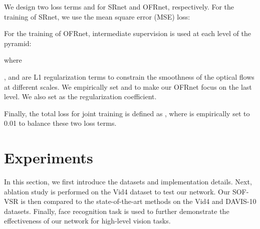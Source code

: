 \documentclass[journal]{IEEEtran}
\begin{document}
	We design two loss terms  and  for SRnet and OFRnet, respectively. For the training of SRnet, we use the mean square error (MSE) loss:
	
	
	
	For the
	training of OFRnet, intermediate supervision is used at each level
	of the pyramid:
	
	where
	
	,  and  are L1 regularization terms to constrain the smoothness of the optical flows at different scales.
	We empirically set  and  to make our OFRnet focus on the last level. We also set  as the regularization coefficient.
	
	
	Finally, the total loss for joint training is defined as ,
	where  is empirically set to 0.01 to balance these two loss terms.
	
	\section{Experiments}
In this section, we first introduce the datasets and implementation details. Next, ablation study is performed on the Vid4 dataset to test our network. Our SOF-VSR is then compared to the state-of-the-art methods on the Vid4 and DAVIS-10 datasets. Finally, face recognition task is used to further demonstrate the effectiveness of our network for high-level vision tasks.
	
\end{document}
